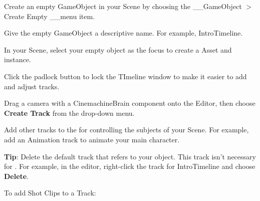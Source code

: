 \begin{DoxyEnumerate}
\item Create an empty Game\+Object in your Scene by choosing the \+\_\+\+\_\+\+Game\+Object \texorpdfstring{$>$}{>} Create Empty \+\_\+\+\_\+menu item.
\item Give the empty Game\+Object a descriptive name. For example, {\ttfamily Intro\+Timeline}.
\item In your Scene, select your empty  object as the focus to create a  Asset and instance.
\item Click the padlock button to lock the TImeline window to make it easier to add and adjust tracks.
\item Drag a  camera with a Cinemachine\+Brain component onto the  Editor, then choose {\bfseries{Create  Track}} from the drop-\/down menu.
\item Add other tracks to the  for controlling the subjects of your Scene. For example, add an Animation track to animate your main character.
\end{DoxyEnumerate}

{\bfseries{Tip}}\+: Delete the default track that refers to your  object. This track isn’t necessary for . For example, in the  editor, right-\/click the track for Intro\+Timeline and choose {\bfseries{Delete}}.

To add  Shot Clips to a  Track\+:


